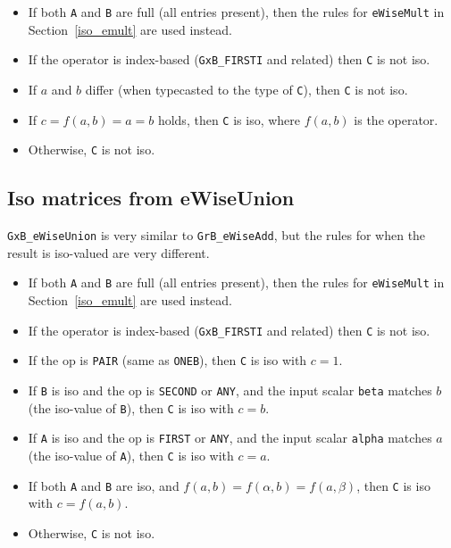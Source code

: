 \documentclass[12pt]{article}
\begin{document}
    \begin{itemize}
    \item If both \verb'A' and \verb'B' are full (all entries present), then
    the rules for \verb'eWiseMult' in Section~\ref{iso_emult} are used
    instead.

    \item If the operator is index-based (\verb'GxB_FIRSTI' and related) then
    \verb'C' is not iso.

    \item If $a$ and $b$ differ (when typecasted to the type of \verb'C'),
    then \verb'C' is not iso.

    \item If $c=f(a,b) = a = b$ holds, then \verb'C' is iso,
    where $f(a,b)$ is the operator.

    \item Otherwise, \verb'C' is not iso.
    \end{itemize}

\subsection{Iso matrices from eWiseUnion}
\label{iso_union}

\verb'GxB_eWiseUnion' is very similar to \verb'GrB_eWiseAdd', but the rules
for when the result is iso-valued are very different.

    \begin{itemize}
    \item If both \verb'A' and \verb'B' are full (all entries present), then
    the rules for \verb'eWiseMult' in Section~\ref{iso_emult} are used
    instead.

    \item If the operator is index-based (\verb'GxB_FIRSTI' and related) then
    \verb'C' is not iso.

    \item If the op is \verb'PAIR' (same as \verb'ONEB'),
        then \verb'C' is iso with $c=1$.

    \item If \verb'B' is iso and the op is \verb'SECOND' or \verb'ANY',
        and the input scalar \verb'beta' matches $b$
        (the iso-value of \verb'B'),
        then \verb'C' is iso with $c=b$.

    \item If \verb'A' is iso and the op is \verb'FIRST' or \verb'ANY',
        and the input scalar \verb'alpha' matches $a$
        (the iso-value of \verb'A'),
        then \verb'C' is iso with $c=a$.

    \item If both \verb'A' and \verb'B' are iso,
        and $f(a,b) = f(\alpha,b) = f(a,\beta)$,
        then \verb'C' is iso with $c=f(a,b)$.

    \item Otherwise, \verb'C' is not iso.
    \end{itemize}
\end{document}
